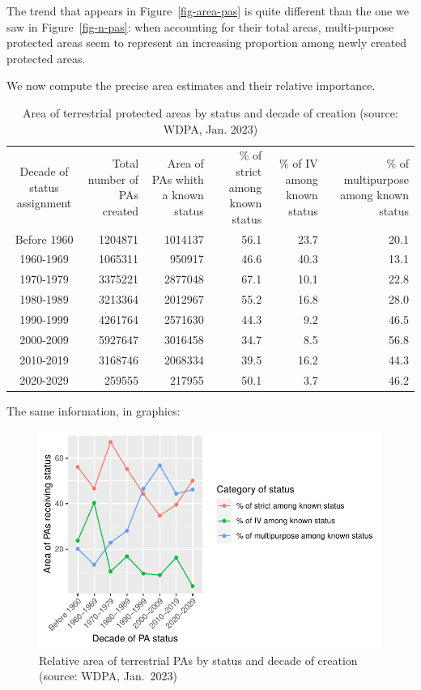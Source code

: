 \documentclass[
  letterpaper,
  DIV=11,
  numbers=noendperiod]{scrartcl}
\begin{document}
The trend that appears in Figure~\ref{fig-area-pas} is quite different
than the one we saw in Figure~\ref{fig-n-pas}: when accounting for their
total areas, multi-purpose protected areas seem to represent an
increasing proportion among newly created protected areas.

We now compute the precise area estimates and their relative importance.

\hypertarget{tbl-area-pas}{}
\begin{longtable}{crrrrr}
\caption{\label{tbl-area-pas}Area of terrestrial protected areas by status and decade of creation
(source: WDPA, Jan. 2023) }\tabularnewline

\caption*{
{\large Area of terrestrial protected areas by status and decade of creation (source: WDPA, Jan. 2023)}
} \\ 
\toprule
Decade of status assignment & Total number of PAs created & Area of PAs whith a known status & \% of strict among known status & \% of IV among known status & \% of multipurpose among known status \\ 
\midrule
Before 1960 & 1204871 & 1014137 & 56.1 & 23.7 & 20.1 \\ 
1960-1969 & 1065311 & 950917 & 46.6 & 40.3 & 13.1 \\ 
1970-1979 & 3375221 & 2877048 & 67.1 & 10.1 & 22.8 \\ 
1980-1989 & 3213364 & 2012967 & 55.2 & 16.8 & 28.0 \\ 
1990-1999 & 4261764 & 2571630 & 44.3 & 9.2 & 46.5 \\ 
2000-2009 & 5927647 & 3016458 & 34.7 & 8.5 & 56.8 \\ 
2010-2019 & 3168746 & 2068334 & 39.5 & 16.2 & 44.3 \\ 
2020-2029 & 259555 & 217955 & 50.1 & 3.7 & 46.2 \\ 
\bottomrule
\end{longtable}

The same information, in graphics:

\begin{figure}

{\centering \includegraphics{Suppl_material_test_EoH_files/figure-pdf/fig-prop-pas_area-1.pdf}

}

\caption{\label{fig-prop-pas_area}Relative area of terrestrial PAs by
status and decade of creation (source: WDPA, Jan.~2023)}

\end{figure}
\end{document}
